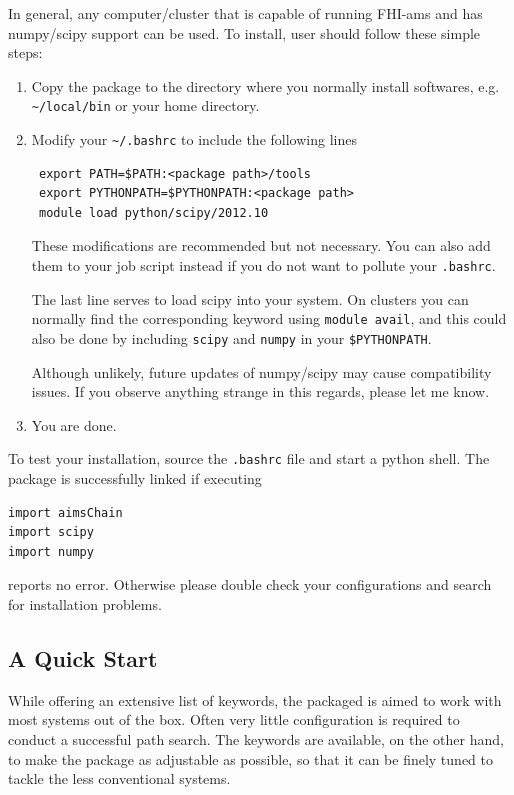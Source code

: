 In general, any computer/cluster that is capable of running FHI-ams and has numpy/scipy support can be used. 
To install, user should follow these simple steps:
\begin{enumerate}
\item Copy the package to the directory where you normally install softwares, e.g. \texttt{\textasciitilde /local/bin} or your home directory.
\item Modify your \texttt{\textasciitilde/.bashrc} to include the following lines 
\begin{verbatim}
 export PATH=$PATH:<package path>/tools
 export PYTHONPATH=$PYTHONPATH:<package path>
 module load python/scipy/2012.10
\end{verbatim}
These modifications are recommended but not necessary. You can also add them to your job script instead if you do not want to pollute your \texttt{.bashrc}.

The last line serves to load scipy into your system. On clusters you can normally find the corresponding keyword using \texttt{module avail}, and this could also be done by including \texttt{scipy} and \texttt{numpy} in your \texttt{\$PYTHONPATH}. 

Although unlikely, future updates of numpy/scipy may cause compatibility issues. If you observe anything strange in this regards, please let me know. 
\item You are done.
\end{enumerate}
To test your installation, source the \texttt{.bashrc} file and start a python shell. The package is successfully linked if executing
\begin{verbatim}
import aimsChain
import scipy
import numpy
\end{verbatim}
reports no error. Otherwise please double check your configurations and search for installation problems. 	

\subsection{A Quick Start}
While offering an extensive list of keywords, the packaged is aimed to work with most systems out of the box. Often very little configuration is required to conduct a successful path search. The keywords are available, on the other hand, to make the package as adjustable as possible, so that it can be finely tuned to tackle the less conventional systems. 

